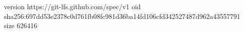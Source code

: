 version https://git-lfs.github.com/spec/v1
oid sha256:697dd53e2378c0d761fb08fc981d36ba14fd106cfd342527487d962a43557791
size 626416
